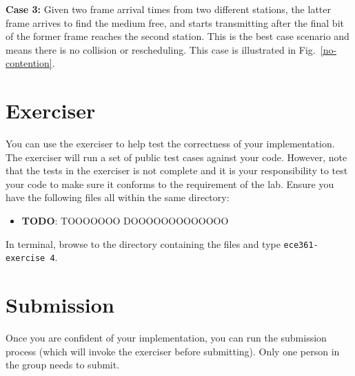 \documentclass[11pt]{article}
\def\thelab{4}
\begin{document}
\textbf{Case 3:} Given two frame arrival times from two different stations, the latter frame arrives to find the medium free, and starts transmitting after the final bit of the former frame reaches the second station.
This is the best case scenario and means there is no collision or rescheduling.
This case is illustrated in Fig.~\ref{no-contention}.





\section{Exerciser}
\label{sec:exercise}
You can use the exerciser to help test the correctness of your implementation.
The exerciser will run a set of public test cases against your code.
However, note that the tests in the exerciser is not complete and it is your responsibility to test your code to make sure it conforms to the requirement of the lab.
Ensure you have the following files all within the same directory:
\begin{itemize}
    \item \textbf{TODO}: TOOOOOOO DOOOOOOOOOOOOO
\end{itemize}

In terminal, browse to the directory containing the files and type \texttt{ece361-exercise \thelab}.

\section{Submission}
\label{sec:submission}
Once you are confident of your implementation, you can run the submission process (which will invoke the exerciser before submitting).
Only one person in the group needs to submit.
\end{document}
